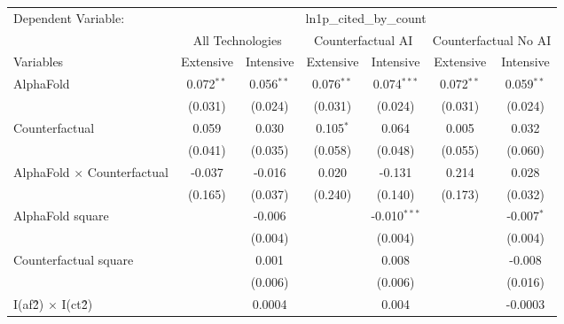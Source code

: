 \begingroup
\centering
\begin{tabular}{lcccccc}
   \tabularnewline \midrule \midrule
   Dependent Variable: & \multicolumn{6}{c}{ln1p\_cited\_by\_count}\\
 & \multicolumn{2}{c}{All Technologies} & \multicolumn{2}{c}{Counterfactual AI} & \multicolumn{2}{c}{Counterfactual No AI} \\
\cmidrule(lr){1-1}\cmidrule(lr){2-3} \cmidrule(lr){4-5} \cmidrule(lr){6-7}
Variables & \multicolumn{1}{c}{Extensive} & \multicolumn{1}{c}{Intensive} & \multicolumn{1}{c}{Extensive} & \multicolumn{1}{c}{Intensive} & \multicolumn{1}{c}{Extensive} & \multicolumn{1}{c}{Intensive} \\
\cmidrule(lr){1-1}\cmidrule(lr){2-2} \cmidrule(lr){3-3} \cmidrule(lr){4-4} \cmidrule(lr){5-5} \cmidrule(lr){6-6} \cmidrule(lr){7-7}
   AlphaFold                          & 0.072$^{**}$ & 0.056$^{**}$ & 0.076$^{**}$ & 0.074$^{***}$  & 0.072$^{**}$ & 0.059$^{**}$\\   
                                      & (0.031)      & (0.024)      & (0.031)      & (0.024)        & (0.031)      & (0.024)\\   
   Counterfactual                     & 0.059        & 0.030        & 0.105$^{*}$  & 0.064          & 0.005        & 0.032\\   
                                      & (0.041)      & (0.035)      & (0.058)      & (0.048)        & (0.055)      & (0.060)\\   
   AlphaFold $\times$ Counterfactual  & -0.037       & -0.016       & 0.020        & -0.131         & 0.214        & 0.028\\   
                                      & (0.165)      & (0.037)      & (0.240)      & (0.140)        & (0.173)      & (0.032)\\   
   AlphaFold square                   &              & -0.006       &              & -0.010$^{***}$ &              & -0.007$^{*}$\\   
                                      &              & (0.004)      &              & (0.004)        &              & (0.004)\\   
   Counterfactual square              &              & 0.001        &              & 0.008          &              & -0.008\\   
                                      &              & (0.006)      &              & (0.006)        &              & (0.016)\\   
   I(af\^2) $\times$ I(ct\^2)         &              & 0.0004       &              & 0.004          &              & -0.0003\\   

\end{tabular}
